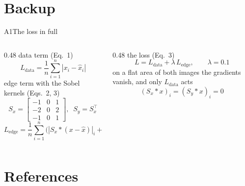 \section[Backup]{Backup}

\begin{frame}[source={Author et al.\ (2026), Journal 1, 1, Eqs.\ 1--3 · Other and Author (2020), Conference}]
  {A1\enspace The loss in full}
  \begin{columns}[T,onlytextwidth]
    \begin{column}{0.48\textwidth}
      \small
      {\scriptsize\color{grey}data term (Eq.\ 1)}
      \[ L_{\mathrm{data}}=\frac{1}{n}\sum_{i=1}^{n}|x_i-\hat{x}_i| \]
      {\scriptsize\color{grey}edge term with the Sobel kernels (Eqs.\ 2, 3)}
      \[ S_x=\left[\begin{array}{rrr}-1&0&1\\-2&0&2\\-1&0&1\end{array}\right],\;\;
         S_y=S_x^{\top} \]
      \[ L_{\mathrm{edge}}=\frac{1}{n}\sum_{i=1}^{n}\big(|S_x\ast(x-\hat{x})|_i+|S_y\ast(x-\hat{x})|_i\big) \]
    \end{column}
    \begin{column}{0.48\textwidth}
      \small
      {\scriptsize\color{grey}the loss (Eq.\ 3)}
      \[ L=L_{\mathrm{data}}+\lambda\,L_{\mathrm{edge}},\qquad \lambda=0.1 \]
      {\scriptsize\color{grey}on a flat area of both images the gradients vanish, and only $L_{\mathrm{data}}$ acts}
      \[ (S_x\ast x)_i=(S_y\ast x)_i=0 \]
    \end{column}
  \end{columns}
\end{frame}

\section[References]{References}

